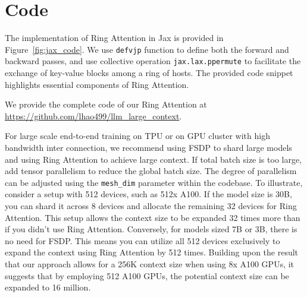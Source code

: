 \documentclass{article}
\newif\ifanonymous
\newcommand{\ours}{{Ring Attention}\xspace}
\begin{document}



\newpage
\appendix

\section{Code}
\label{sec:code}
The implementation of \ours in Jax is provided in Figure~\ref{fig:jax_code}. We use \texttt{defvjp} function to define both the forward and backward passes, and use collective operation \texttt{jax.lax.ppermute} to facilitate the exchange of key-value blocks among a ring of hosts.
The provided code snippet highlights essential components of \ours.
\ifanonymous
We provide the complete code of our \ours at \texttt{\textcolor{gray}{link removed for anonymous review}}.
\else
We provide the complete code of our \ours at \url{https://github.com/lhao499/llm_large_context}.
\fi

For large scale end-to-end training on TPU or on GPU cluster with high bandwidth inter connection, we recommend using FSDP to shard large models and using \ours to achieve large context. If total batch size is too large, add tensor parallelism to reduce the global batch size. The degree of parallelism can be adjusted using the \texttt{mesh\_dim} parameter within the codebase.
To illustrate, consider a setup with 512 devices, such as 512x A100. If the model size is 30B, you can shard it across 8 devices and allocate the remaining 32 devices for \ours. This setup allows the context size to be expanded 32 times more than if you didn't use \ours. Conversely, for models sized 7B or 3B, there is no need for FSDP. This means you can utilize all 512 devices exclusively to expand the context using \ours by 512 times. Building upon the result that our approach allows for a 256K context size when using 8x A100 GPUs, it suggests that by employing 512 A100 GPUs, the potential context size can be expanded to 16 million.
\end{document}
